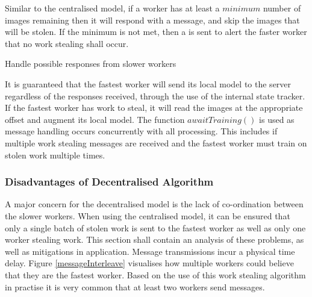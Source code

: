 \documentclass[12pt]{article}
\begin{document}
Similar to the centralised model, if a worker has at least a $minimum$ number of images remaining then it will respond with a  message, and skip the images that will be stolen. If the minimum is not met, then a  is sent to alert the faster worker that no work stealing shall occur.

\IncMargin{1em}
\begin{algorithm}[H]
 \BlankLine
 \BlankLine
 \setcounter{AlgoLine}{0}
 \BlankLine
 \caption{Handle possible responses from slower workers}
 \label{DecentralisedAlgorithmWorkerResponse}
\end{algorithm}
\DecMargin{1em}
\medskip

It is guaranteed that the fastest worker will send its local model to the server regardless of the responses received, through the use of the  internal state tracker.
\newline
\newline
If the fastest worker has work to steal, it will read the images at the appropriate offset and augment its local model. The function $awaitTraining()$ is used as message handling occurs concurrently with all processing. This includes if multiple work stealing messages are received and the fastest worker must train on stolen work multiple times.

\subsubsection{Disadvantages of Decentralised Algorithm}
A major concern for the decentralised model is the lack of co-ordination between the slower workers. When using the centralised model, it can be ensured that only a single batch of stolen work is sent to the fastest worker as well as only one worker stealing work. This section shall contain an analysis of these problems, as well as mitigations in application.
\newline
\newline
Message transmissions incur a physical time delay. Figure \ref{messageInterleave} visualises how multiple workers could believe that they are the fastest worker. Based on the use of this work stealing algorithm in practise it is very common that at least two workers send  messages.
\end{document}
